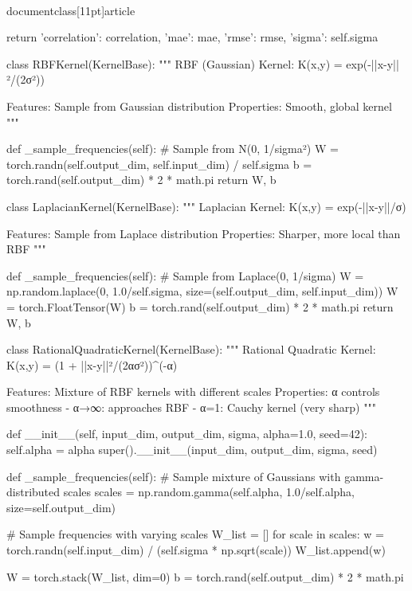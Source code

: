 \\documentclass[11pt]{article}
\begin{document}
\begin{CodeBlock}
        return {
            'correlation': correlation,
            'mae': mae,
            'rmse': rmse,
            'sigma': self.sigma
        }


class RBFKernel(KernelBase):
    """
    RBF (Gaussian) Kernel: K(x,y) = exp(-||x-y||²/(2σ²))
    
    Features: Sample from Gaussian distribution
    Properties: Smooth, global kernel
    """
    
    def _sample_frequencies(self):
        # Sample from N(0, 1/sigma²)
        W = torch.randn(self.output_dim, self.input_dim) / self.sigma
        b = torch.rand(self.output_dim) * 2 * math.pi
        return W, b


class LaplacianKernel(KernelBase):
    """
    Laplacian Kernel: K(x,y) = exp(-||x-y||/σ)
    
    Features: Sample from Laplace distribution
    Properties: Sharper, more local than RBF
    """
    
    def _sample_frequencies(self):
        # Sample from Laplace(0, 1/sigma)
        W = np.random.laplace(0, 1.0/self.sigma, 
                              size=(self.output_dim, self.input_dim))
        W = torch.FloatTensor(W)
        b = torch.rand(self.output_dim) * 2 * math.pi
        return W, b


class RationalQuadraticKernel(KernelBase):
    """
    Rational Quadratic Kernel: K(x,y) = (1 + ||x-y||²/(2ασ²))^(-α)
    
    Features: Mixture of RBF kernels with different scales
    Properties: α controls smoothness
      - α→∞: approaches RBF
      - α=1: Cauchy kernel (very sharp)
    """
    
    def __init__(self, input_dim, output_dim, sigma, alpha=1.0, seed=42):
        self.alpha = alpha
        super().__init__(input_dim, output_dim, sigma, seed)
    
    def _sample_frequencies(self):
        # Sample mixture of Gaussians with gamma-distributed scales
        scales = np.random.gamma(self.alpha, 1.0/self.alpha, 
                                 size=self.output_dim)
        
        # Sample frequencies with varying scales
        W_list = []
        for scale in scales:
            w = torch.randn(self.input_dim) / (self.sigma * np.sqrt(scale))
            W_list.append(w)
        
        W = torch.stack(W_list, dim=0)
        b = torch.rand(self.output_dim) * 2 * math.pi
        

\end{CodeBlock}
\end{document}
